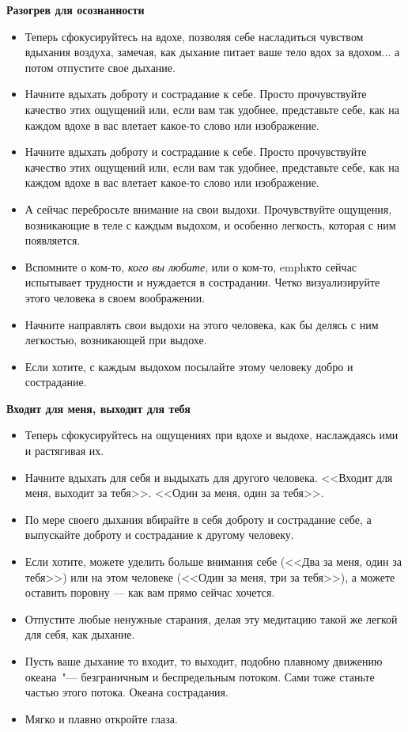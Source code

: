{\large \textbf{Разогрев для осознанности}}
\begin{itemize}
	\item Теперь сфокусируйтесь на вдохе, позволяя себе насладиться чувством вдыхания воздуха, замечая, как дыхание питает ваше тело вдох за вдохом... а потом отпустите свое дыхание.
	\item Начните вдыхать доброту и сострадание к себе. Просто прочувствуйте качество этих ощущений или, если вам так удобнее, представьте себе, как на каждом вдохе в вас влетает какое-то слово или изображение.
	\item Начните вдыхать доброту и сострадание к себе. Просто прочувствуйте качество этих ощущений или, если вам так удобнее, представьте себе, как на каждом вдохе в вас влетает какое-то слово или изображение.
	\item А сейчас перебросьте внимание на свои выдохи. Прочувствуйте ощущения, возникающие в теле с каждым выдохом, и особенно легкость, которая с ним появляется.
	\item Вспомните о ком-то, \emph{кого вы любите}, или о ком-то, emph{кто сейчас испытывает трудности} и нуждается в сострадании. Четко визуализируйте этого человека в своем воображении.
	\item Начните направлять свои выдохи на этого человека, как бы делясь с ним легкостью, возникающей при выдохе.
	\item Если хотите, с каждым выдохом посылайте этому человеку добро и сострадание.
\end{itemize}

\vspace{2ex}

{\large \textbf{Входит для меня, выходит для тебя}}
\begin{itemize}
	\item Теперь сфокусируйтесь на ощущениях при вдохе и выдохе, наслаждаясь ими и растягивая их.
	\item Начните вдыхать для себя и выдыхать для другого человека. <<Входит для меня, выходит за тебя>>. <<Один за меня, один за тебя>>.
	\item По мере своего дыхания вбирайте в себя доброту и сострадание себе, а выпускайте доброту и сострадание к другому человеку.
	\item Если хотите, можете уделить больше внимания себе (<<Два за меня, один за тебя>>) или на этом человеке (<<Один за меня, три за тебя>>), а можете оставить поровну — как вам прямо сейчас хочется.
	\item Отпустите любые ненужные старания, делая эту медитацию такой же легкой для себя, как дыхание.
	\item Пусть ваше дыхание то входит, то выходит, подобно плавному движению океана~"--- безграничным и беспредельным потоком. Сами тоже станьте частью этого потока. Океана сострадания.
	\item Мягко и плавно откройте глаза.
\end{itemize}

